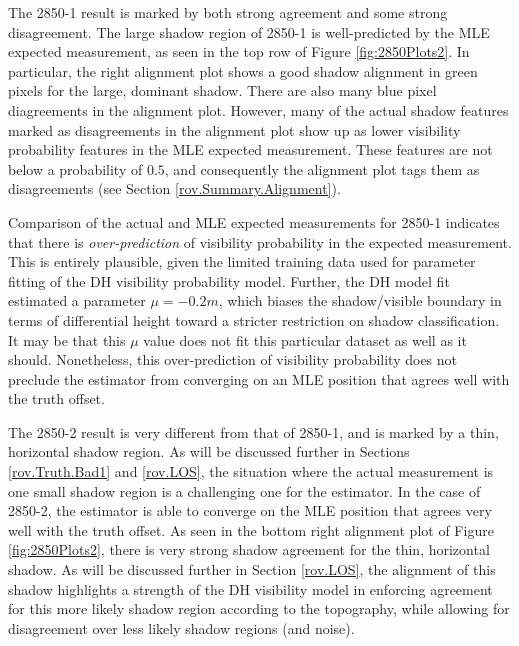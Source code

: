 The 2850-1 result is marked by both strong agreement and some strong disagreement.
The large shadow region of 2850-1 is well-predicted by the MLE expected measurement, as seen in the top row of Figure \ref{fig:2850Plots2}.
In particular, the right alignment plot shows a good shadow alignment in green pixels for the large, dominant shadow.
There are also many blue pixel diagreements in the alignment plot.
However, many of the actual shadow features marked as disagreements in the alignment plot show up as lower visibility probability features in the MLE expected measurement.
These features are not below a probability of $0.5$, and consequently the alignment plot tags them as disagreements (see Section \ref{rov.Summary.Alignment}).

Comparison of the actual and MLE expected measurements for 2850-1 indicates that there is \emph{over-prediction} of visibility probability in the expected measurement.
This is entirely plausible, given the limited training data used for parameter fitting of the DH visibility probability model.
Further, the DH model fit estimated a parameter $\mu = -0.2m$, which biases the shadow/visible boundary in terms of differential height toward a stricter restriction on shadow classification.
It may be that this $\mu$ value does not fit this particular dataset as well as it should.
Nonetheless, this over-prediction of visibility probability does not preclude the estimator from converging on an MLE position that agrees well with the truth offset.

The 2850-2 result is very different from that of 2850-1, and is marked by a thin, horizontal shadow region.
As will be discussed further in Sections \ref{rov.Truth.Bad1} and \ref{rov.LOS}, the situation where the actual measurement is one small shadow region is a challenging one for the estimator.
In the case of 2850-2, the estimator is able to converge on the MLE position that agrees very well with the truth offset.
As seen in the bottom right alignment plot of Figure \ref{fig:2850Plots2}, there is very strong shadow agreement for the thin, horizontal shadow.
As will be discussed further in Section \ref{rov.LOS}, the alignment of this shadow highlights a strength of the DH visibility model in enforcing agreement for this more likely shadow region according to the topography, while allowing for disagreement over less likely shadow regions (and noise).

